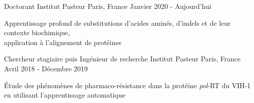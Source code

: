 

\begin{cventries}

  \cventry
    {Doctorant} %
    {Institut Pasteur} %
    {Paris, France} %
    {Janvier 2020 - Aujourd'hui} %
    {
      \begin{cvitems} %
        \item {Apprentissage profond de substitutions d'acides amin\'es, d'indels et de leur contexte biochimique, \\application \`a l'alignement de prot\'eines}
      \end{cvitems}
    }
  \cventry
    {Chercheur stagiaire puis Ingénieur de recherche} %
    {Institut Pasteur} %
    {Paris, France} %
    {Avril 2018 - D\'ecembre 2019} %
    {
      \begin{cvitems} %
        \item {Étude des phénomènes de pharmaco-résistance dans la protéine \textit{pol}-RT du VIH-1 en utilisant l'apprentissage automatique}
      \end{cvitems}
    }
    \cventry

\end{cventries}
